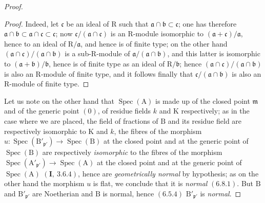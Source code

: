 \begin{proof}
\begin{proof}
Indeed, let $\mathfrak{c}$ be an ideal of $\mathrm{R}$ such that $\mathfrak{a}\cap\mathfrak{b}\subset\mathfrak{c}$; one has therefore $\mathfrak{a}\cap\mathfrak{b}\subset\mathfrak{a}\cap\mathfrak{c}\subset\mathfrak{c}$; now
$\mathfrak{c}/(\mathfrak{a}\cap\mathfrak{c})$ is an $\mathrm{R}$-module isomorphic to $(\mathfrak{a}+\mathfrak{c})/\mathfrak{a}$, hence to an ideal of $\mathrm{R}/\mathfrak{a}$, and hence
is of finite type; on the other hand $(\mathfrak{a}\cap\mathfrak{c})/(\mathfrak{a}\cap\mathfrak{b})$ is a sub-$\mathrm{R}$-module of $\mathfrak{a}/(\mathfrak{a}\cap\mathfrak{b})$, and
this latter is isomorphic to $(\mathfrak{a}+\mathfrak{b})/\mathfrak{b}$, hence is of finite type as an ideal of $\mathrm{R}/\mathfrak{b}$;
hence $(\mathfrak{a}\cap\mathfrak{c})/(\mathfrak{a}\cap\mathfrak{b})$ is also an $\mathrm{R}$-module of finite type, and it follows finally that
$\mathfrak{c}/(\mathfrak{a}\cap\mathfrak{b})$ is also an $\mathrm{R}$-module of finite type.
\end{proof}

Let us note on the other hand that $\operatorname{Spec}(\mathrm{A})$ is made up of the closed point $\mathfrak{m}$ and of the generic
point $(0)$, of residue fields $k$ and $\mathrm{K}$ respectively; as in the case where we
are placed, the field of fractions of $\mathrm{B}$ and its residue field are respectively
isomorphic to $\mathrm{K}$ and $k$, the fibres of the morphism $u:\operatorname{Spec}(\mathrm{B}'_{\mathfrak{p}'})\to\operatorname{Spec}(\mathrm{B})$ at the closed point
and at the generic point of $\operatorname{Spec}(\mathrm{B})$ are respectively \emph{isomorphic} to the fibres of the morphism
$\operatorname{Spec}(\mathrm{A}'_{\mathfrak{p}'})\to\operatorname{Spec}(\mathrm{A})$ at the closed point and at the generic point of $\operatorname{Spec}(\mathrm{A})$ $(\mathbf{I},~3.6.4)$, hence
are \emph{geometrically normal} by hypothesis; as on the other hand the morphism $u$ is flat,
we conclude that it is \emph{normal} $(6.8.1)$. But $\mathrm{B}$ and $\mathrm{B}'_{\mathfrak{p}'}$ are Noetherian and $\mathrm{B}$ is normal, hence
$(6.5.4)$ $\mathrm{B}'_{\mathfrak{p}'}$ is \emph{normal}.


\end{proof}

